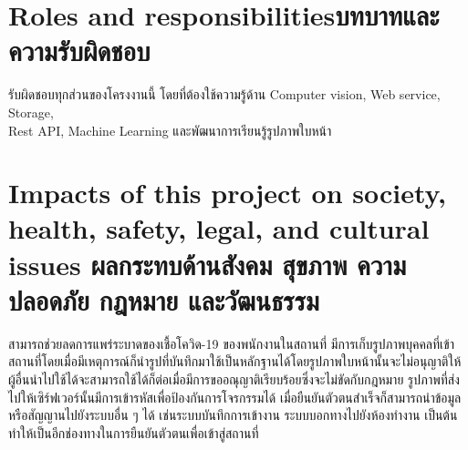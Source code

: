 \section{\ifenglish Roles and responsibilities\else บทบาทและความรับผิดชอบ\fi}
รับผิดชอบทุกส่วนของโครงงานนี้ โดยที่ต้องใช้ความรู้ด้าน Computer vision, Web service, Storage, \\ Rest API, Machine Learning และพัฒนาการเรียนรู้รูปภาพใบหน้า

\section{\ifenglish%
Impacts of this project on society, health, safety, legal, and cultural issues
\else%
ผลกระทบด้านสังคม สุขภาพ ความปลอดภัย กฎหมาย และวัฒนธรรม
\fi}

สามารถช่วยลดการแพร่ระบาดของเชื้อโควิด-19 ของพนักงานในสถานที่ มีการเก็บรูปภาพบุคคลที่เข้าสถานที่โดยเมื่อมีเหตุการณ์ก็นำรูปที่บันทึกมาใช้เป็นหลักฐานได้โดยรูปภาพใบหน้านั้นจะไม่อนุญาติให้ผู้อื่นนำไปใช้ได้จะสามารถใช้ได้ก็ต่อเมื่อมีการขออณุญาติเรียบร้อยซึ่งจะไม่ขัดกับกฎหมาย 
รูปภาพที่ส่งไปให้เซิร์ฟเวอร์นั้นมีการเข้ารหัสเพื่อป้องกันการโจรกรรมได้ เมื่อยืนยันตัวตนสำเร็จก็สามารถนำข้อมูลหรือสัญญานไปยังระบบอื่น ๆ ได้ เช่นระบบบันทึกการเข้างาน ระบบบอกทางไปยังห้องทำงาน เป็นต้น ทำให้เป็นอีกช่องทางในการยืนยันตัวตนเพื่อเข้าสู่สถานที่
